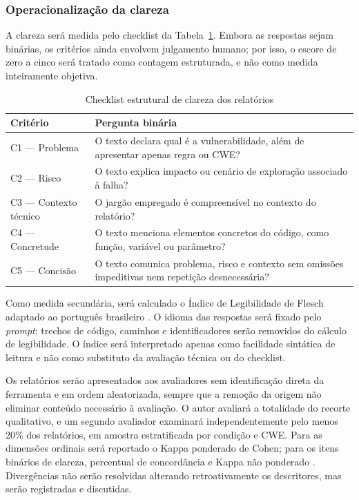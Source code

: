 \subsubsection{Operacionalização da clareza}\label{subsubsec:operacionalizacao-clareza}

A clareza será medida pelo checklist da Tabela~\ref{tab:checklist-clareza}. Embora as respostas sejam binárias, os critérios ainda envolvem julgamento humano; por isso, o escore de zero a cinco será tratado como contagem estruturada, e não como medida inteiramente objetiva.

\begin{table}[htb]
\ABNTEXfontereduzida
\caption{\label{tab:checklist-clareza}Checklist estrutural de clareza dos relatórios}
\centering
\begin{tabularx}{\textwidth}{|l|X|}
\hline
\textbf{Critério} & \textbf{Pergunta binária} \\
\hline
C1 --- Problema & O texto declara qual é a vulnerabilidade, além de apresentar apenas regra ou CWE? \\
\hline
C2 --- Risco & O texto explica impacto ou cenário de exploração associado à falha? \\
\hline
C3 --- Contexto técnico & O jargão empregado é compreensível no contexto do relatório? \\
\hline
C4 --- Concretude & O texto menciona elementos concretos do código, como função, variável ou parâmetro? \\
\hline
C5 --- Concisão & O texto comunica problema, risco e contexto sem omissões impeditivas nem repetição desnecessária? \\
\hline
\end{tabularx}
\end{table}

Como medida secundária, será calculado o Índice de Legibilidade de Flesch adaptado ao português brasileiro \cite{Martins1996ReadabilityPortuguese}. O idioma das respostas será fixado pelo \textit{prompt}; trechos de código, caminhos e identificadores serão removidos do cálculo de legibilidade. O índice será interpretado apenas como facilidade sintática de leitura e não como substituto da avaliação técnica ou do checklist.

Os relatórios serão apresentados aos avaliadores sem identificação direta da ferramenta e em ordem aleatorizada, sempre que a remoção da origem não eliminar conteúdo necessário à avaliação. O autor avaliará a totalidade do recorte qualitativo, e um segundo avaliador examinará independentemente pelo menos 20\% dos relatórios, em amostra estratificada por condição e CWE. Para as dimensões ordinais será reportado o Kappa ponderado de Cohen; para os itens binários de clareza, percentual de concordância e Kappa não ponderado \cite{Landis1977ObserverAgreement}. Divergências não serão resolvidas alterando retroativamente os descritores, mas serão registradas e discutidas.

